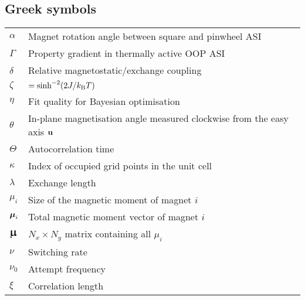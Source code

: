 \subsection*{Greek symbols}
\begin{longtable}[l]{p{60pt} p{350pt}}
	$\alpha$ & Magnet rotation angle between square and pinwheel ASI\vspace{\whiteline}\\
	
	$\Gamma$ & Property gradient in thermally active OOP ASI\vspace{\whiteline}\\

	$\delta$ & Relative magnetostatic/exchange coupling\vspace{\whiteline}\\
	
	$\zeta$ & $=\sinh^{-2}(2J/\kBT)$\vspace{\whiteline}\\
	
	$\eta$ & Fit quality for Bayesian optimisation\vspace{\whiteline}\\

	$\theta$ & In-plane magnetisation angle measured clockwise from the easy axis $\boldsymbol{\mathbf{u}}$ \\
	$\Theta$ & Autocorrelation time\vspace{\whiteline}\\
	
	$\kappa$ & Index of occupied grid points in the unit cell\vspace{\whiteline}\\
	
	$\lambda$ & Exchange length\vspace{\whiteline}\\

	$\mu_i$ & Size of the magnetic moment of magnet $i$ \\
	$\boldsymbol{\mathbf{\mu}}_i$ & Total magnetic moment vector of magnet $i$ \\
	$\vc{\bigmu}$ & $N_x \times N_y$ matrix containing all $\mu_i$\vspace{\whiteline}\\
	
	$\nu$ & Switching rate \\
	$\nu_0$ & Attempt frequency\vspace{\whiteline}\\
	
	$\xi$ & Correlation length\vspace{\whiteline}\\


\end{longtable}
